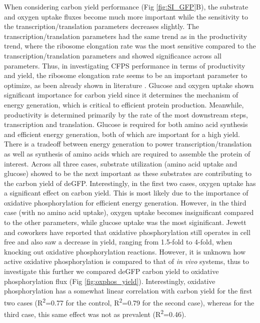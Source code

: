 \documentclass[journal=asbcd6,manuscript=article]{achemso}
\begin{document}
When considering carbon yield performance (Fig \ref{fig:SI_GFP}B), the substrate and oxygen uptake fluxes become much more important while the sensitivity to the transcription/translation parameters decreases slightly.
The transcription/translation parameters had the same trend as in the productivity trend, where the ribosome elongation rate was the most sensitive compared to the transcription/translation parameters and showed significance across all parameters.
Thus, in investigating CFPS performance in terms of productivity and yield, the ribosome elongation rate seems to be an important parameter to optimize, as been already shown in literature \cite{2005_underwood_biotech, 2014_li_PlosOne}.
Glucose and oxygen uptake shown significant importance for carbon yield since it determines the mechanism of energy generation, which is critical to efficient protein production.
Meanwhile, productivity is determined primarily by the rate of the most downstream steps, transcription and translation.
Glucose is required for both amino acid synthesis and efficient energy generation, both of which are important for a high yield.
There is a tradeoff between energy generation to power transcription/translation as well as synthesis of amino acids which are required to assemble the protein of interest.
Across all three cases, substrate utilization (amino acid uptake and glucose) showed to be the next important as these substrates are contributing to the carbon yield of deGFP.
Interestingly, in the first two cases, oxygen uptake has a significant effect on carbon yield.
This is most likely due to the importance of oxidative phosphorylation for efficient energy generation.
However, in the third case (with no amino acid uptake), oxygen uptake becomes insignificant compared to the other parameters, while glucose uptake was the most siginificant.
Jewett and coworkers have reported that oxidative phosphorylation still operates in cell free and also saw a decrease in yield, ranging from 1.5-fold to 4-fold, when knocking out oxidative phosphorylation reactions\cite{Jewett:2008aa}.
However, it is unknown how active oxidative phosphorylation is compared to that of \textit{in vivo} systems, thus to investigate this further we compared deGFP carbon yield to oxidative phosphorylation flux (Fig \ref{fig:oxphos_yield}).
Interestingly, oxidative phosphorylation has a somewhat linear correlation with carbon yield for the first two cases (R\textsuperscript{2}=0.77 for the control, R\textsuperscript{2}=0.79 for the second case), whereas for the third case, this same effect was not as prevalent (R\textsuperscript{2}=0.46).
\end{document}
